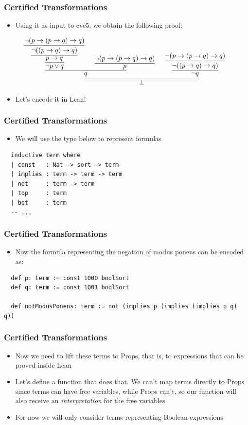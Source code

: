 \documentclass[usepdftitle=false,aspectratio=169,usenames,dvipsnames]{beamer}
\newcommand\vitem{\vfill\item}
\begin{document}
\begin{frame}
  \frametitle{Certified Transformations}
  \begin{itemize}
    \item Using it as input to cvc5, we obtain the following proof:
  \end{itemize}
  \centering
  \vfill
  \[
    \infer[]{\bot}{\infer[]{q}{\infer[]{\neg p \vee q}{\infer[]{p \rightarrow q}{\infer[]{\neg ((p \rightarrow q) \rightarrow q)}{\neg (p \rightarrow (p \rightarrow q) \rightarrow q)}}} & \infer[]{p}{\neg (p \rightarrow (p \rightarrow q) \rightarrow q)}} & \infer[]{\neg q}{\infer[]{\neg ((p \rightarrow q) \rightarrow q)}{\neg (p \rightarrow (p \rightarrow q) \rightarrow q)}}}
  \]
  \begin{itemize}
    \item Let's encode it in Lean!
  \end{itemize}
\end{frame}

\begin{frame}[fragile]
  \frametitle{Certified Transformations}
  \begin{itemize}
    \item We will use the type below to represent formulas
  \end{itemize}
  \vfill
  \begin{verbatim}
  inductive term where
  | const   : Nat -> sort -> term
  | implies : term -> term -> term
  | not     : term -> term
  | top     : term
  | bot     : term
  -- ...
  \end{verbatim}
\end{frame}

\begin{frame}[fragile]
  \frametitle{Certified Transformations}
  \begin{itemize}
    \item Now the formula representing the negation of modus ponens can be encoded as:
  \end{itemize}
  \vfill
  \begin{verbatim}
  def p: term := const 1000 boolSort
  def q: term := const 1001 boolSort

  def notModusPonens: term := not (implies p (implies (implies p q) q))
  \end{verbatim}
\end{frame}

\begin{frame}
  \frametitle{Certified Transformations}
  \begin{itemize}
    \item Now we need to lift these terms to Props, that is, to expressions that can be proved inside Lean
    \vitem Let's define a function that does that. We can't map terms directly to Props since terms can have free variables, while Props can't, so our function will also receive an \textit{interpretation} for the free variables
    \vitem For now we will only consider terms representing Boolean expressions
  \end{itemize}
\end{frame}
\end{document}
